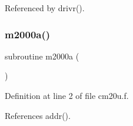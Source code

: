 Referenced by drivr().

\mbox{\label{cm20u_8f_a9c778f8f57ba39e6f6df3b90aa35654c}} 
\subsubsection{\texorpdfstring{m2000a()}{m2000a()}}
{\footnotesize\ttfamily subroutine m2000a (\begin{DoxyParamCaption}{ }\end{DoxyParamCaption})}



Definition at line 2 of file cm20u.\+f.



References addr().

